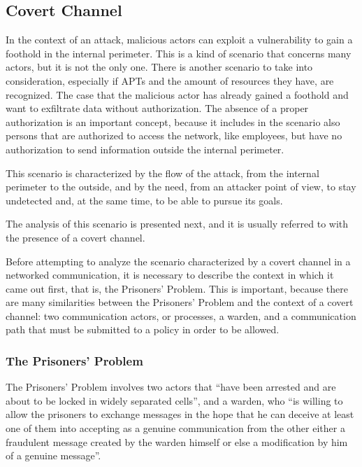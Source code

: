 \documentclass[12pt]{article}
\begin{document}
\subsection{Covert Channel}
\label{sub:covert}


In the context of an attack, malicious actors can exploit a vulnerability to gain a foothold in the internal perimeter. This is a kind of scenario that concerns many actors, but it is not the only one. There is another scenario to take into consideration, especially if APTs and the amount of resources they have, are recognized. The case that the malicious actor has already gained a foothold and want to exfiltrate data without authorization. The absence of a proper authorization is an important concept, because it includes in the scenario also persons that are authorized to access the network, like employees, but have no authorization to send information outside the internal perimeter.

This scenario is characterized by the flow of the attack, from the internal perimeter to the outside, and by the need, from an attacker point of view, to stay undetected and, at the same time, to be able to pursue its goals. 

The analysis of this scenario is presented next, and it is usually referred to with the presence of a covert channel.

Before attempting to analyze the scenario characterized by a covert channel in a networked communication, it is necessary to describe the context in which it came out first, that is, the Prisoners' Problem. This is important, because there are many similarities between the Prisoners' Problem and the context of a covert channel: two communication actors, or processes, a warden, and a communication path that must be submitted to a policy in order to be allowed.

\subsubsection{The Prisoners' Problem}
\label{subsub:prisoners}

The Prisoners' Problem involves two actors that ``have been arrested and are about to be locked in widely separated cells'', and a warden, who ``is willing to allow the prisoners to exchange messages in the hope that he can deceive at least one of them into accepting as a genuine communication from the other either a fraudulent message created by the warden himself or else a modification by him of a genuine message''\cite{prisoners}.
\end{document}
